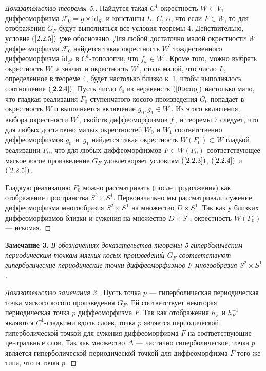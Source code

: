 \documentclass[12pt]{article}
\begin{document}
\begin{proof}[Доказательство теоремы 5.]
 Найдутся такая $C^1$-окрестность $W\subset V_1$ диффеоморфизма $\mathcal F_0=g\times\mbox{id}_{S^1}$ и константы $L,\  C,\ \alpha$, что если $F\in W$, то для отображения $G_F$ будут выполняться все условия теоремы 4. 
Действительно, условие $(\ref{2.2.5})$  уже обосновано.
Для любой достаточно малой окрестности $W$ диффеоморфизма $\mathcal F_0$ найдется такая окрестность $W^\prime$ тождественного диффеоморфизма $\mbox{id}_{S^1}$ в $C^1$-топологии, что 
$f_{\omega}\in W^\prime$.  
Кроме того, можно выбрать окрестность $W$, а значит и окрестность $W^\prime$, столь малой, что число $L$, определенное в теореме 4, будет настолько близко к~1, чтобы выполнялось соотношение $(\ref{2.2.4})$.  
Пусть число $\delta_0$ из неравенств $(\ref{0temp})$ настолько мало, что гладкая реализация $F_0$ ступенчатого косого произведения $G_0$ попадает в окрестность $W$ и выполняется включение
$g_0,g_1\in W^\prime$.
Из этого включения, выбора окрестности $W^\prime$, свойств диффеоморфизмов $f_{\omega}$ и теоремы 7 следует, что для любых достаточно малых окрестностей $W_0$ и $W_1$ соответственно диффеоморфизмов $g_0$~и~$g_1$ найдется такая окрестность $W(F_0)\subset W$ гладкой реализации $F_0$, 
 что для любых диффеоморфизмов $F\in W(F_0)$ соответствующее мягкое косое произведение $G_F$ удовлетворяет условиям $(\ref{2.2.3})$, $(\ref{2.2.4})$ и~$(\ref{2.2.5})$.

Гладкую реализацию $F_0$ можно рассматривать (после продолжения) как отображение пространства $S^2\times S^1$. 
 Первоначально мы рассматривали сужение диффеоморфизма многообразия $S^2\times S^1$ на множество $D\times S^1$. Так как у близких диффеоморфизмов близки и сужения на множество $D\times S^1$, окрестность $W(F_0)$ --- искомая.  %
\end{proof}
\textbf{Замечание 3.}
\textit{
В обозначениях доказательства теоремы 5
гиперболическим периодическим точкам мягких косых произведений $G_F$ соответствуют гиперболические периодические точки диффеоморфизмов $F$ многообразия $S^2\times S^1$.
}
\begin{proof}[Доказательство замечания 3.] Пусть точка $p$ --- гиперболическая периодическая точка мягкого косого произведения $G_F$. Ей соответствует некоторая периодическая точка $\bar{p}$ диффеоморфизма $F$. Так как отображения $h_F$ и $h_F^{-1}$ являются $C^1$-гладкими вдоль слоев, точка $\bar{p}$ является периодической гиперболической точкой для сужения диффеоморфизма $F$ на соответствующие центральные слои. 
Так как множество $\Delta$ --- частично гиперболическое,
точка $\bar{p}$ является гиперболической периодической точкой для диффеоморфизма $F$ того же типа, что и точка $p$. 
\end{proof}
\end{document}
